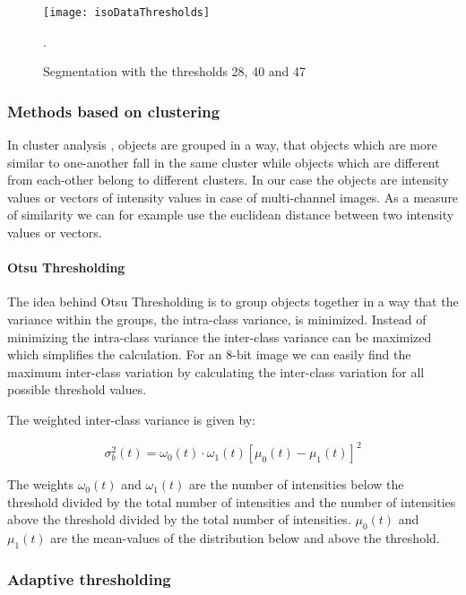 \begin{figure}[h!]
  \centering
\texttt{[image: isoDataThresholds]}
    \caption[isoData-segmentation]{Segmentation with the thresholds 28, 40 and 47}.
    \label{isoData-segmentations}
\end{figure}

\subsubsection{Methods based on clustering}

In cluster analysis \cite{tan_introduction_2019}, objects are grouped in a way, that objects which are more similar to one-another fall in the same cluster while objects which are different from each-other belong to different clusters. In our case the objects are intensity values or vectors of intensity values in case of multi-channel images. As a measure of similarity we can for example use the euclidean distance between two intensity values or vectors. 

\paragraph{Otsu Thresholding}

The idea behind Otsu Thresholding \cite{otsu79} is to group objects together in a way that the variance within the groups, the intra-class variance, is minimized. Instead of minimizing the intra-class variance the inter-class variance can be maximized which simplifies the calculation. For an 8-bit image we can easily find the maximum inter-class variation by calculating the inter-class variation for all possible threshold values.

The weighted inter-class variance is given by:

\begin{equation}
	\sigma_{b}^{2}(t) = \omega_{0}(t)\cdot\omega_{1}(t)[\mu_{0}(t) - \mu_{1}(t)]^2
\end{equation}

The weights $\omega_{0}(t)$ and $\omega_{1}(t)$ are the number of intensities below the threshold divided by the total number of intensities and the number of intensities above the threshold divided by the total number of intensities. $\mu_{0}(t)$ and $\mu_{1}(t)$ are the mean-values of the distribution below and above the threshold.

\subsubsection{Adaptive thresholding}

